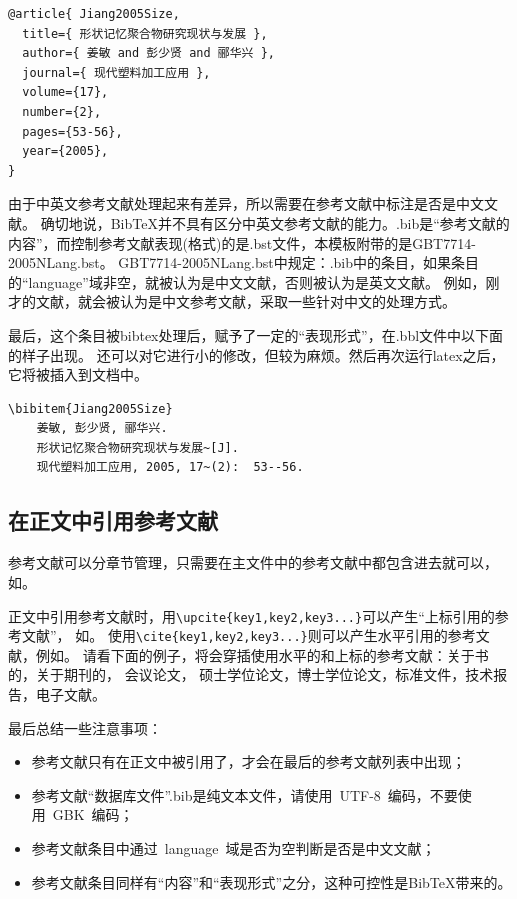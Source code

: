   \begin{lstlisting}[caption={一个符合规范的.bib条目}, label=itemok, float, escapeinside="", numbers=none]
@article{ Jiang2005Size,
  title={ 形状记忆聚合物研究现状与发展 },
  author={ 姜敏 and 彭少贤 and 郦华兴 },
  journal={ 现代塑料加工应用 },
  volume={17},
  number={2},
  pages={53-56},
  year={2005},
}
  \end{lstlisting}

由于中英文参考文献处理起来有差异，所以需要在参考文献中标注是否是中文文献。
确切地说，BibTeX并不具有区分中英文参考文献的能力。.bib是“参考文献的内容”，而控制参考文献表现(格式)的是.bst文件，本模板附带的是GBT7714-2005NLang.bst。
GBT7714-2005NLang.bst中规定：.bib中的条目，如果条目的``language''域非空，就被认为是中文文献，否则被认为是英文文献。
例如，刚才的文献，就会被认为是中文参考文献，采取一些针对中文的处理方式。

最后，这个条目被bibtex处理后，赋予了一定的``表现形式''，在.bbl文件中以下面的样子出现。
还可以对它进行小的修改，但较为麻烦。然后再次运行latex之后，它将被插入到文档中。

\begin{lstlisting}[caption={.bbl中被格式化之后的条目}, escapeinside="", numbers=none]
\bibitem{Jiang2005Size}
	姜敏, 彭少贤, 郦华兴.
	形状记忆聚合物研究现状与发展~[J].
	现代塑料加工应用, 2005, 17~(2):  53--56.
\end{lstlisting}


\subsection{在正文中引用参考文献}

参考文献可以分章节管理，只需要在主文件中的参考文献中都包含进去就可以，如\verb++。

正文中引用参考文献时\citep{Jiang2005Size}，用\verb+\upcite{key1,key2,key3...}+可以产生“上标引用的参考文献”，
如。
使用\verb+\cite{key1,key2,key3...}+则可以产生水平引用的参考文献，例如\cite{JohnD,zhubajie,IEEE-1363}。
请看下面的例子，将会穿插使用水平的和上标的参考文献：关于书的\cite{Meta_CN,JohnD,IEEE-1363}，关于期刊的，
会议论文\cite{DPMG,kocher99,cnproceed}，
硕士学位论文\cite{zhubajie,metamori2004}，博士学位论文，标准文件\cite{IEEE-1363}，技术报告，电子文献\cite{xiaoyu2001, CHRISTINE1998}。

最后总结一些注意事项：
\begin{itemize}
\item  参考文献只有在正文中被引用了，才会在最后的参考文献列表中出现；
\item  参考文献``数据库文件''.bib是纯文本文件，请使用~UTF-8~编码，不要使用~GBK~编码；
\item  参考文献条目中通过~language~域是否为空判断是否是中文文献；
\item  参考文献条目同样有“内容”和“表现形式”之分，这种可控性是BibTeX带来的。
\end{itemize}


